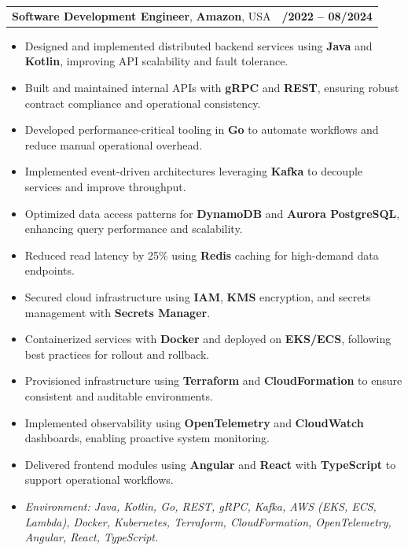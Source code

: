 \documentclass[letterpaper,11pt]{article}
\makeatletter
\newcommand{\resumeItem}[1]{
  \item\footnotesize{
    {#1 \vspace{-2pt}}
  }
}
\newcommand{\resumeSubheading}[4]{
  \vspace{-2pt}\item
    \begin{tabular*}{1.0\textwidth}[t]{l@{\extracolsep{\fill}}r}
      \textbf{\fontsize{10pt}{14pt}\selectfont #3}, \textbf{\fontsize{10pt}{14pt}\selectfont #1}, \fontsize{10pt}{14pt}\selectfont #4 & \textbf{\fontsize{10pt}{14pt}\selectfont #2} \\
    \end{tabular*}\vspace{-7pt}
}
\newcommand{\resumeItemListStart}{\begin{itemize}[leftmargin=*]}
\newcommand{\resumeItemListEnd}{\end{itemize}\vspace{-5pt}}
\makeatother
\begin{document}
\resumeSubheading
{Amazon}{10/2022 -- 08/2024}
{Software Development Engineer}{USA}
\resumeItemListStart
  \resumeItem{Designed and implemented distributed backend services using \textbf{Java} and \textbf{Kotlin}, improving API scalability and fault tolerance.}
  \resumeItem{Built and maintained internal APIs with \textbf{gRPC} and \textbf{REST}, ensuring robust contract compliance and operational consistency.}
  \resumeItem{Developed performance-critical tooling in \textbf{Go} to automate workflows and reduce manual operational overhead.}
  \resumeItem{Implemented event-driven architectures leveraging \textbf{Kafka} to decouple services and improve throughput.}
  \resumeItem{Optimized data access patterns for \textbf{DynamoDB} and \textbf{Aurora PostgreSQL}, enhancing query performance and scalability.}
  \resumeItem{Reduced read latency by 25\% using \textbf{Redis} caching for high-demand data endpoints.}
  \resumeItem{Secured cloud infrastructure using \textbf{IAM}, \textbf{KMS} encryption, and secrets management with \textbf{Secrets Manager}.}
  \resumeItem{Containerized services with \textbf{Docker} and deployed on \textbf{EKS/ECS}, following best practices for rollout and rollback.}
  \resumeItem{Provisioned infrastructure using \textbf{Terraform} and \textbf{CloudFormation} to ensure consistent and auditable environments.}
  \resumeItem{Implemented observability using \textbf{OpenTelemetry} and \textbf{CloudWatch} dashboards, enabling proactive system monitoring.}
  \resumeItem{Delivered frontend modules using \textbf{Angular} and \textbf{React} with \textbf{TypeScript} to support operational workflows.}
  \resumeItem{\textit{Environment: Java, Kotlin, Go, REST, gRPC, Kafka, AWS (EKS, ECS, Lambda), Docker, Kubernetes, Terraform, CloudFormation, OpenTelemetry, Angular, React, TypeScript.}}
\resumeItemListEnd
\end{document}
